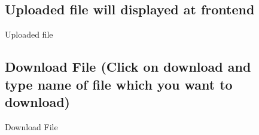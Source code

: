 \begin{figure}[h]
\subsection{Uploaded file will displayed at frontend}
  \centering
   \caption{Uploaded file}
\end{figure}

\begin{figure}[h]
\subsection{Download File (Click on download and type name of file which
you want to download)}
  \centering
   \caption{Download File}
\end{figure}

